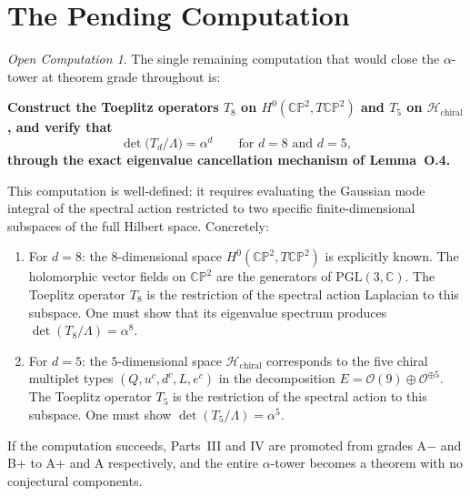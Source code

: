 \documentclass[11pt]{article}
\theoremstyle{definition}
\theoremstyle{remark}
\newtheorem*{opencomp}{Open Computation}
\newcommand{\CP}{\mathbb{CP}}
\begin{document}
\section{The Pending Computation}
\label{sec:open}

\begin{opencomp}
The single remaining computation that would close the $\alpha$-tower
at theorem grade throughout is:
\end{opencomp}

\textbf{Construct the Toeplitz operators $T_8$ on
$H^0(\CP^2, T\CP^2)$ and $T_5$ on
$\mathcal{H}_{\mathrm{chiral}}$, and verify that}
\begin{equation}\label{eq:pending}
  \det\bigl(T_d / \Lambda\bigr) = \alpha^{d}
  \qquad\text{for } d = 8 \text{ and } d = 5,
\end{equation}
\textbf{through the exact eigenvalue cancellation mechanism of
Lemma~O.4.}

\medskip

This computation is well-defined: it requires evaluating the Gaussian
mode integral of the spectral action restricted to two specific
finite-dimensional subspaces of the full Hilbert space.  Concretely:

\begin{enumerate}
\item For $d = 8$: the $8$-dimensional space $H^0(\CP^2, T\CP^2)$ is
  explicitly known.  The holomorphic vector fields on $\CP^2$ are the
  generators of $\mathrm{PGL}(3, \mathbb{C})$.  The Toeplitz operator
  $T_8$ is the restriction of the spectral action Laplacian to this
  subspace.  One must show that its eigenvalue spectrum produces
  $\det(T_8/\Lambda) = \alpha^{8}$.

\item For $d = 5$: the $5$-dimensional space
  $\mathcal{H}_{\mathrm{chiral}}$ corresponds to the five chiral
  multiplet types $(Q, u^c, d^c, L, e^c)$ in the decomposition
  $E = \mathcal{O}(9) \oplus \mathcal{O}^{\oplus 5}$.  The Toeplitz
  operator $T_5$ is the restriction of the spectral action to this
  subspace.  One must show $\det(T_5/\Lambda) = \alpha^{5}$.
\end{enumerate}

If the computation succeeds, Parts~III and IV are promoted from
grades A$-$ and B+ to A+ and A respectively, and the entire
$\alpha$-tower becomes a theorem with no conjectural components.
\end{document}
